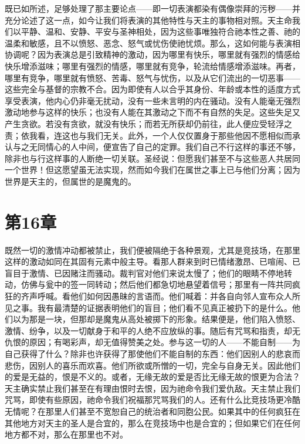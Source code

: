 既已如所述，足够处理了那主要论点——即一切表演都染有偶像崇拜的污秽——并充分论述了这一点，如今让我们将表演的其他特性与天主的事物相对照。天主命我们以平静、温和、安静、平安与圣神相处，因为这些事唯独符合祂本性之善、祂的温柔和敏感，且不以愤怒、恶念、怒气或忧伤使祂忧烦。那么，这如何能与表演相协调呢？因为表演总是引致精神的激动，因为哪里有快乐，哪里就有强烈的情感给快乐增添滋味；哪里有强烈的情感，哪里就有竞争，轮流给情感增添滋味。再者，哪里有竞争，哪里就有愤怒、苦毒、怒气与忧伤，以及从它们流出的一切恶事——这些完全与基督的宗教不合。因为即使有人以合乎其身份、年龄或本性的适度方式享受表演，他内心仍非毫无扰动，没有一些未言明的内在骚动。没有人能毫无强烈激动地参与这样的快乐；也没有人能在其激动之下而不有自然的失足。这些失足又产生贪欲。若没有贪欲，就没有快乐；而若无所获却仍前往，此人便应受轻浮之责；依我看，连这也与我们无关。此外，一个人仅仅置身于那些他因不愿相似而承认与之无同情心的人中间，便宣告了自己的定罪。我们自己不行这样的事还不够，除非也与行这样事的人断绝一切关联。圣经说：但愿我们甚至不与这些恶人共居同一个世界！但这愿望虽无法实现，然而如今我们在属世之事上已与他们分离；因为世界是天主的，但属世的是魔鬼的。\par


\section{第16章}

既然一切的激情冲动都被禁止，我们便被隔绝于各种景观，尤其是竞技场，在那里这样的激动如同在其固有元素中般主导。看那人群来到时已情绪激昂、已喧闹、已盲目于激情、已因赌注而骚动。裁判官对他们来说太慢了；他们的眼睛不停地转动，仿佛与瓮中的签一同转动；然后他们都急切地悬望着信号；那里有一阵共同疯狂的齐声呼喊。看他们如何因愚昧的言语而。他们喊着：并各自向邻人宣布众人所见之事。我有最清楚的证据表明他们的盲目；他们看不见真正被扔下的是什么。他们以为那是一块，但那却是魔鬼从高处被掷下的形象。结果便是，他们陷入愤怒、激情、纷争，以及一切献身于和平的人绝不应放纵的事。随后有咒骂和指责，却无仇恨的原因；有喝彩声，却无值得赞美之处。参与这一切的人——不能自制——为自己获得了什么？除非也许获得了那使他们不能自制的东西：他们因别人的悲哀而悲伤，因别人的喜乐而欢喜。他们所欲或所憎的一切，完全与自身无关。因此他们的爱是无益的，恨是不义的。或者，无缘无故的爱是否比无缘无故的恨更为合法？天主确实禁止我们甚至在有理由恨时去恨，因为祂命令我们爱仇敌。天主禁止我们咒骂，即使有些原因，祂命令我们祝福那咒骂我们的人。还有什么比竞技场更冷酷无情呢？在那里人们甚至不宽恕自己的统治者和同胞公民。如果其中的任何疯狂在其他地方对天主的圣人是合宜的，那么在竞技场中也是合宜的；但如果它们在任何地方都不对，那么在那里也不对。\par

